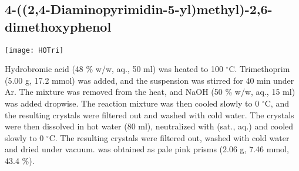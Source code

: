 \newpage


\subsection{4-((2,4-Diaminopyrimidin-5-yl)methyl)-2,6-dimethoxyphenol }


\begin{scheme}[H]
	\begin{center}
		\texttt{[image: HOTri]}
	\end{center}
\end{scheme}

Hydrobromic acid (48 \% w/w, aq., 50 ml) was heated to 100 $^{\circ}$C. Trimethoprim  (5.00 g, 17.2 mmol) was added, and the suspension was stirred for 40 min under Ar. The mixture was removed from the heat, and NaOH (50 \% w/w, aq., 15 ml) was added dropwise. The reaction mixture was then cooled slowly to 0 $^{\circ}$C, and the resulting crystals were filtered out and washed with cold water. The crystals were then dissolved in hot water (80 ml), neutralized with  (sat., aq.) and cooled slowly to 0 $^{\circ}$C. The resulting crystals were filtered out, washed with cold water and dried under vacuum.  was obtained as pale pink prisms (2.06 g, 7.46 mmol, 43.4 \%).
\\[1\baselineskip]
\\[1\baselineskip]
\\[1\baselineskip]
